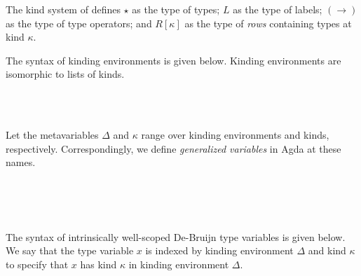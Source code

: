 \documentclass[authoryear, acmsmall, screen, review, nonacm]{acmart}
\begin{document}
The kind system of \Rome defines $\star$ as the type of types; $L$ as the type of labels; $(\to)$ as the type of type operators; and $R[\kappa]$ as the type of \emph{rows} containing types at kind $\kappa$.

The syntax of kinding environments is given below. Kinding environments are isomorphic to lists of kinds.

\begin{code}%
\>[0]\AgdaSpace{}%
\AgdaSpace{}%
\AgdaSymbol{:}\AgdaSpace{}%
\AgdaSpace{}%
\<%
\\
\>[0][@{}l@{\AgdaIndent{0}}]%
\>[2]\AgdaSpace{}%
\AgdaSymbol{:}\AgdaSpace{}%
\<%
\\
%
\>[2]\AgdaOperator{\AgdaInductiveConstructor{\AgdaUnderscore{},,\AgdaUnderscore{}}}\AgdaSpace{}%
\AgdaSymbol{:}\AgdaSpace{}%
\AgdaSpace{}%
\AgdaSpace{}%
\AgdaSpace{}%
\AgdaSpace{}%
\<%
\end{code}

Let the metavariables $\Delta$ and $\kappa$ range over kinding environments and kinds, respectively. Correspondingly, we define \emph{generalized variables} in Agda at these names. 

\begin{code}%
\>[0]\<%
\\
\>[0][@{}l@{\AgdaIndent{0}}]%
\>[2]\<%
\\
\>[2][@{}l@{\AgdaIndent{0}}]%
\>[4]\AgdaSpace{}%
\AgdaSpace{}%
\AgdaSpace{}%
\AgdaSpace{}%
\AgdaSymbol{:}\AgdaSpace{}%
\<%
\\
%
\>[4]\AgdaSpace{}%
\AgdaSpace{}%
\AgdaSpace{}%
\AgdaSymbol{:}\AgdaSpace{}%
\<%
\end{code}

The syntax of intrinsically well-scoped De-Bruijn type variables is given below. We say that the type variable $x$ is indexed by kinding environment $\Delta$ and kind $\kappa$ to specify that $x$ has kind $\kappa$ in kinding environment $\Delta$.
\end{document}
